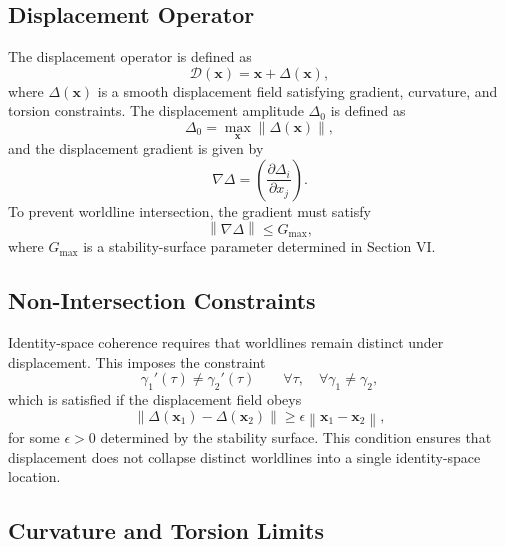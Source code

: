 \documentclass[aip,adv,reprint,floatfix]{revtex4-2}
\begin{document}
\subsection{Displacement Operator}

The displacement operator is defined as
\begin{equation}
\mathcal{D}(\mathbf{x}) = \mathbf{x} + \Delta(\mathbf{x}),
\end{equation}
where $\Delta(\mathbf{x})$ is a smooth displacement field satisfying gradient, curvature, and torsion constraints. The displacement amplitude $\Delta_0$ is defined as
\begin{equation}
\Delta_0 = \max_{\mathbf{x}} \left\| \Delta(\mathbf{x}) \right\|,
\end{equation}
and the displacement gradient is given by
\begin{equation}
\nabla \Delta = \left( \frac{\partial \Delta_i}{\partial x_j} \right).
\end{equation}
To prevent worldline intersection, the gradient must satisfy
\begin{equation}
\left\| \nabla \Delta \right\| \leq G_{\max},
\end{equation}
where $G_{\max}$ is a stability-surface parameter determined in Section VI.

\subsection{Non-Intersection Constraints}

Identity-space coherence requires that worldlines remain distinct under displacement. This imposes the constraint
\begin{equation}
\gamma_1'(\tau) \neq \gamma_2'(\tau)
\qquad
\forall \tau, \quad \forall \gamma_1 \neq \gamma_2,
\end{equation}
which is satisfied if the displacement field obeys
\begin{equation}
\left\| \Delta(\mathbf{x}_1) - \Delta(\mathbf{x}_2) \right\|
\geq
\epsilon \left\| \mathbf{x}_1 - \mathbf{x}_2 \right\|,
\end{equation}
for some $\epsilon > 0$ determined by the stability surface. This condition ensures that displacement does not collapse distinct worldlines into a single identity-space location.

\subsection{Curvature and Torsion Limits}
\end{document}
